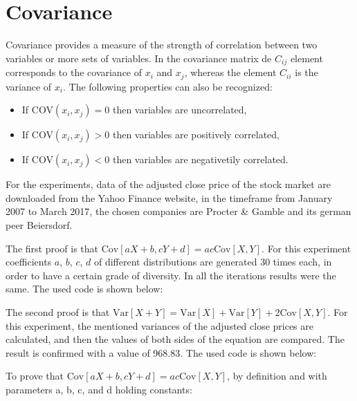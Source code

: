 \documentclass[10pt,leter,openany]{article}
\begin{document}
 
 \vspace{1cm}
 
  

\clearpage	
\section{Covariance}
Covariance provides a measure of the strength of correlation between two variables or more sets of variables. In the covariance matrix de $ C_{ij}$ element corresponds to the covariance of $ x_{i }$ and $ x_{j }$, whereas the element $ C_{ii} $ is the variance of $ x_{i} $. The following properties can also be recognized:
\begin{itemize}
	\item If COV$(x_{i},x_{j}) = 0$ then variables are uncorrelated,
	\item If COV$(x_{i},x_{j}) > 0$ then variables are positively correlated,
	\item If COV$(x_{i},x_{j}) < 0$ then variables are negativetily correlated.
\end{itemize}

For the experiments, data of the adjusted close price of the stock market are downloaded from the Yahoo Finance website, in the timeframe from January 2007 to March 2017, the chosen companies are Procter \& Gamble and its german peer Beiersdorf.

The first proof is that $\mbox{Cov}[aX+b, cY+d] = ac\mbox{Cov}[X,Y]$. For this experiment coefficients $a$, $b$, $c$, $d$ of different distributions are generated 30 times each, in order to have a certain grade of diversity. In all the iterations results were the same. The used code is shown below:



The second proof is that $\mbox{Var}[X+Y] = \mbox{Var}[X] + \mbox{Var}[Y] + 2\mbox{Cov}[X,Y]$. For this experiment, the mentioned variances of the adjusted close prices are calculated, and then the values of both sides of the equation are compared. The result is confirmed with a value of 968.83. The used code is shown below:



To prove that $\mbox{Cov}[aX+b, cY+d] = ac\mbox{Cov}[X,Y]$, by definition \citep{grinstead2012introduction} and with parameters a, b, c, and d holding constants:
\end{document}
